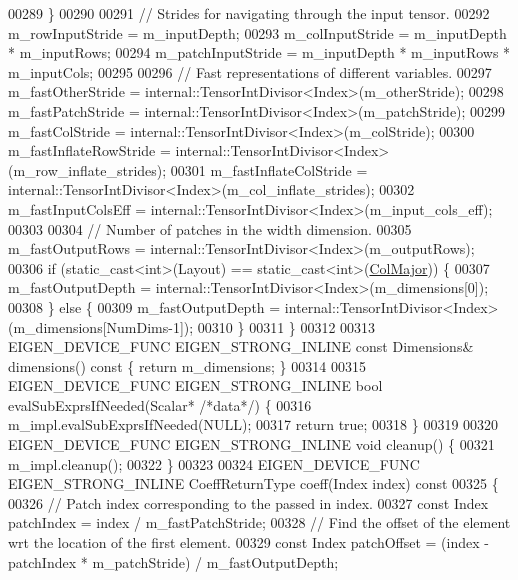 \begin{DoxyCode}
00289     \}
00290 
00291     \textcolor{comment}{// Strides for navigating through the input tensor.}
00292     m\_rowInputStride = m\_inputDepth;
00293     m\_colInputStride = m\_inputDepth * m\_inputRows;
00294     m\_patchInputStride = m\_inputDepth * m\_inputRows * m\_inputCols;
00295 
00296     \textcolor{comment}{// Fast representations of different variables.}
00297     m\_fastOtherStride = internal::TensorIntDivisor<Index>(m\_otherStride);
00298     m\_fastPatchStride = internal::TensorIntDivisor<Index>(m\_patchStride);
00299     m\_fastColStride = internal::TensorIntDivisor<Index>(m\_colStride);
00300     m\_fastInflateRowStride = internal::TensorIntDivisor<Index>(m\_row\_inflate\_strides);
00301     m\_fastInflateColStride = internal::TensorIntDivisor<Index>(m\_col\_inflate\_strides);
00302     m\_fastInputColsEff = internal::TensorIntDivisor<Index>(m\_input\_cols\_eff);
00303 
00304     \textcolor{comment}{// Number of patches in the width dimension.}
00305     m\_fastOutputRows = internal::TensorIntDivisor<Index>(m\_outputRows);
00306     \textcolor{keywordflow}{if} (static\_cast<int>(Layout) == \textcolor{keyword}{static\_cast<}\textcolor{keywordtype}{int}\textcolor{keyword}{>}(\hyperlink{group__enums_ggaacded1a18ae58b0f554751f6cdf9eb13a0cbd4bdd0abcfc0224c5fcb5e4f6669a}{ColMajor})) \{
00307       m\_fastOutputDepth = internal::TensorIntDivisor<Index>(m\_dimensions[0]);
00308     \} \textcolor{keywordflow}{else} \{
00309       m\_fastOutputDepth = internal::TensorIntDivisor<Index>(m\_dimensions[NumDims-1]);
00310     \}
00311   \}
00312 
00313   EIGEN\_DEVICE\_FUNC EIGEN\_STRONG\_INLINE \textcolor{keyword}{const} Dimensions& dimensions()\textcolor{keyword}{ const }\{ \textcolor{keywordflow}{return} m\_dimensions; \}
00314 
00315   EIGEN\_DEVICE\_FUNC EIGEN\_STRONG\_INLINE \textcolor{keywordtype}{bool} evalSubExprsIfNeeded(Scalar* \textcolor{comment}{/*data*/}) \{
00316     m\_impl.evalSubExprsIfNeeded(NULL);
00317     \textcolor{keywordflow}{return} \textcolor{keyword}{true};
00318   \}
00319 
00320   EIGEN\_DEVICE\_FUNC EIGEN\_STRONG\_INLINE \textcolor{keywordtype}{void} cleanup() \{
00321     m\_impl.cleanup();
00322   \}
00323 
00324   EIGEN\_DEVICE\_FUNC EIGEN\_STRONG\_INLINE CoeffReturnType coeff(Index index)\textcolor{keyword}{ const}
00325 \textcolor{keyword}{  }\{
00326     \textcolor{comment}{// Patch index corresponding to the passed in index.}
00327     \textcolor{keyword}{const} Index patchIndex = index / m\_fastPatchStride;
00328     \textcolor{comment}{// Find the offset of the element wrt the location of the first element.}
00329     \textcolor{keyword}{const} Index patchOffset = (index - patchIndex * m\_patchStride) / m\_fastOutputDepth;

\end{DoxyCode}
